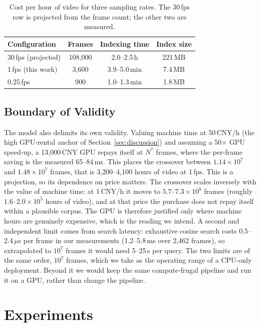 \documentclass[journal]{IEEEtran}
\begin{document}
\begin{table}[t]
\centering
\caption{Cost per hour of video for three sampling rates. The 30\,fps row is projected from the
frame count; the other two are measured.}
\label{tab:perhour}
\begin{tabular*}{\columnwidth}{@{\extracolsep{\fill}}lccc@{}}
\toprule
Configuration & Frames & Indexing time & Index size \\
\midrule
30\,fps (projected)      & 108{,}000 & 2.0--2.5\,h  & 221\,MB \\
1\,fps (this work)       & 3{,}600   & 3.9--5.0\,min & 7.4\,MB \\
0.25\,fps                & 900       & 1.0--1.3\,min & 1.8\,MB \\
\bottomrule
\end{tabular*}
\end{table}

\subsection{Boundary of Validity}\label{sec:boundary}
The model also delimits its own validity. Valuing machine time at 50\,CNY/h (the high GPU-rental anchor of Section~\ref{sec:discussion}) and assuming a
50$\times$ GPU speed-up, a 13{,}000\,CNY GPU repays itself at $N^{*}$ frames, where the
per-frame saving is the measured 65--84\,ms. This places the crossover between
$1.14\times10^{7}$ and $1.48\times10^{7}$ frames, that is 3{,}200--4{,}100 hours of video at
1\,fps. This is a projection, so its dependence on price matters. The crossover scales inversely with
the value of machine time: at 1\,CNY/h it moves to $5.7$--$7.3\times10^{8}$ frames (roughly
$1.6$--$2.0\times10^{5}$ hours of video), and at that price the purchase does not repay itself
within a plausible corpus. The GPU is therefore justified only where machine hours
are genuinely expensive, which is the reading we intend. A second and independent limit comes from search latency: exhaustive cosine search costs
0.5--2.4\,$\mu$s per frame in our measurements (1.2--5.8\,ms over 2{,}462 frames), so
extrapolated to $10^{7}$ frames it would need 5--25\,s per query. The two limits are of the same
order, $10^{7}$ frames, which we take as the operating range of a CPU-only deployment. Beyond it
we would keep the same compute-frugal pipeline and run it on a GPU, rather than change the
pipeline.

\section{Experiments}\label{sec:exp}
\end{document}
